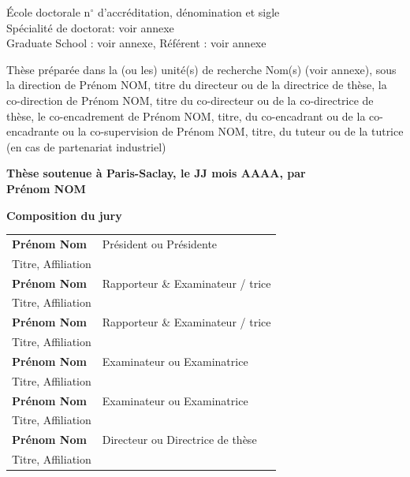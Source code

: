 \documentclass[french,12pt,a4paper]{book}
\begin{document}
\begin{titlepage}
		\vspace{6mm}
		
		\small École doctorale n$^{\circ}$ d'accréditation, dénomination et sigle\\
		\small Spécialité de doctorat: voir annexe\\
		\small Graduate School : voir annexe, Référent : voir annexe \\
		\vspace{6mm}
		
		\footnotesize Thèse préparée dans la (ou les) unité(s) de recherche Nom(s) (voir annexe), sous la direction de Prénom NOM, titre du directeur ou de la directrice de thèse, la co-direction de Prénom NOM, titre du co-directeur ou de la co-directrice de thèse, le co-encadrement de Prénom NOM, titre, du co-encadrant ou de la co-encadrante ou la co-supervision de Prénom NOM, titre, du tuteur ou de la tutrice (en cas de partenariat industriel) \\
		\vspace{15mm}
		
		\textbf{Thèse soutenue à Paris-Saclay, le JJ mois AAAA, par}\\
		\bigskip
		\Large {\color{Prune} \textbf{Prénom NOM}} %
		
		\vspace{\fill} %
		
		\bigskip
		
		\flushleft
		\small \textbf{Composition du jury}\\
		\vspace{2mm}
		\scriptsize
		\begin{tabular}{|p{7cm}l}
			\arrayrulecolor{Prune}
			\textbf{Prénom Nom} &   Président ou Présidente\\ 
			Titre, Affiliation & \\
			\textbf{Prénom Nom} &  Rapporteur \& Examinateur / trice \\ 
			Titre, Affiliation   &   \\ 
			\textbf{Prénom Nom} &  Rapporteur \& Examinateur / trice \\ 
			Titre, Affiliation  &   \\ 
			\textbf{Prénom Nom} &  Examinateur ou Examinatrice \\ 
			Titre, Affiliation   &   \\ 
			\textbf{Prénom Nom} &  Examinateur ou Examinatrice \\ 
			Titre, Affiliation   &   \\ 
			\textbf{Prénom Nom} &  Directeur ou Directrice de thèse \\ 
			Titre, Affiliation   &   \\ 
			
		\end{tabular} 
		
	\end{titlepage}
\end{document}
